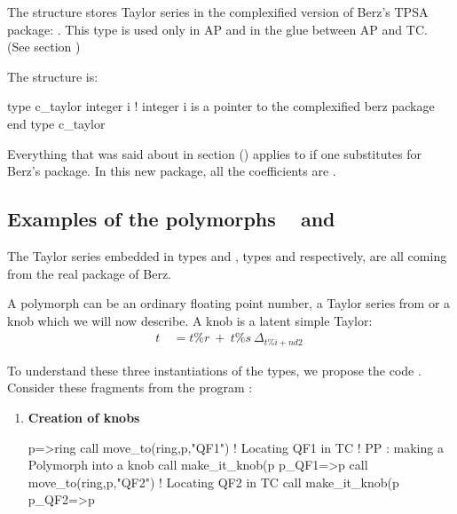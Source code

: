 \documentclass{hitec}     %
\def\tc{https://twikinew.ihep.ac.cn/pubfppptc/Web/Programs/}
\begin{document}
{{{{{{{The  structure stores  Taylor series in the complexified version of Berz's TPSA package: . This type is used only in AP and in the glue between AP and TC. (See section  )

The structure is:
\begin{code}
type c_taylor
 integer i ! integer i is a pointer to the complexified berz package
end type c_taylor
\end{code}   

Everything that was said about  in section () applies to  if one substitutes  for Berz's package. In this new package, all the coefficients are .

 \subsection{Examples of the polymorphs    ~ and    }\label{s:rc8}
  
 The Taylor series embedded in types  and , types  and  respectively, are all coming from the real package  of Berz. 
 
 A  polymorph can be an ordinary floating point number, a Taylor series from   or a knob which we will now describe. A knob is a latent  simple Taylor:
\begin{align} t\ &= t\%r\ +\ t\%s\ {\Delta }_{t\%i+nd2}~\label{eq:knobdef} \end{align}


To understand these three instantiations of the  types, we propose the  code \href{\tc z_track_real_8.f90}{}.  Consider these fragments from the program  :




 
 
 \begin{enumerate}
 \item\label{itc1} {\bf Creation of knobs}
 
  \begin{code}
p=>ring%
call move_to(ring,p,"QF1")   !  Locating QF1 in TC
!  PP : making a Polymorph into a knob
call make_it_knob(p%
p_QF1=>p
call move_to(ring,p,"QF2")   ! Locating QF2 in TC
call make_it_knob(p%
p_QF2=>p


\end{code}
\end{enumerate}}}}}}}}
\end{document}
